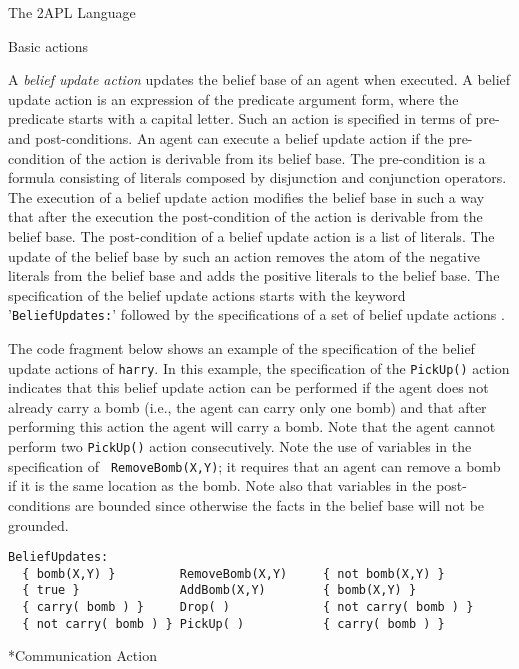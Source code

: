 \begin{chapter}{The 2APL Language}
\begin{section}{Basic actions}
\begin{subsection}
A {\em belief update action} updates the belief base of an agent
when executed. A belief update action  is an
expression of the predicate argument form, where the predicate
starts with a capital letter. Such an action is specified in terms
of pre- and post-conditions. An agent can execute a belief update
action if the pre-condition of the action is derivable from its
belief base. The pre-condition is a formula consisting of literals
composed by disjunction and conjunction operators. The execution of
a belief update action modifies the belief base in such a way that
after the execution the post-condition of the action is derivable
from the belief base. The post-condition of a belief update action
is a list of literals. The update of the belief base by such an
action removes the atom of the negative literals from the belief
base and adds the positive literals to the belief base. The
specification of the belief update actions starts with the keyword
'{\tt BeliefUpdates:}' followed by the specifications of a set of
belief update actions .

The code fragment below shows an example of the specification of the
belief update actions of {\tt harry}. In this example, the
specification of the {\tt PickUp()} action indicates that this
belief update action can be performed if the agent does not already
carry a bomb (i.e., the agent can carry only one bomb) and that
after performing this action the agent will carry a bomb.  Note that
the agent cannot perform two {\tt PickUp()} action consecutively.
Note the use of variables in the specification of {\tt
RemoveBomb(X,Y)}; it requires that an agent can remove a bomb if it
is the same location as the bomb. Note also that variables in the
post-conditions are bounded since otherwise the facts in the belief
base will not be grounded.

\begin{verbatim}
BeliefUpdates:
  { bomb(X,Y) }         RemoveBomb(X,Y)     { not bomb(X,Y) }
  { true }              AddBomb(X,Y)        { bomb(X,Y) }
  { carry( bomb ) }     Drop( )             { not carry( bomb ) }
  { not carry( bomb ) } PickUp( )           { carry( bomb ) }
\end{verbatim}

\end{subsection}

\begin{subsection}*{Communication Action}


\end{subsection}
\end{section}
\end{chapter}
